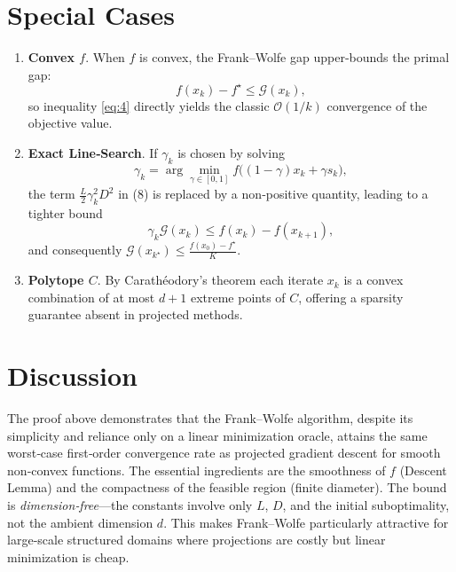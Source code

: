 \documentclass{article}
\newcommand{\gap}{\mathcal{G}}
\begin{document}
\section*{Special Cases}
\begin{enumerate}[leftmargin=*]
\item \textbf{Convex $f$}. When $f$ is convex, the Frank–Wolfe gap upper‑bounds the primal gap:
\[
f(x_k)-f^\star \le \gap(x_k),
\]
so inequality \eqref{eq:4} directly yields the classic $\mathcal O(1/k)$ convergence of the objective value.

\item \textbf{Exact Line‑Search}. If $\gamma_k$ is chosen by solving
\[
\gamma_k = \arg\min_{\gamma\in[0,1]} f\big((1-\gamma)x_k+\gamma s_k\big),
\]
the term $\frac{L}{2}\gamma_k^{2}D^{2}$ in (8) is replaced by a non‑positive quantity,
leading to a tighter bound
\[
\gamma_k\gap(x_k)\le f(x_k)-f(x_{k+1}),
\]
and consequently $\gap(x_{k^\star})\le \frac{f(x_0)-f^\star}{K}$.

\item \textbf{Polytope $C$}. By Carathéodory’s theorem each iterate $x_k$ is a convex combination of at most $d+1$ extreme points of $C$, offering a sparsity guarantee absent in projected methods.

\end{enumerate}

\section*{Discussion}
The proof above demonstrates that the Frank–Wolfe algorithm, despite its simplicity
and reliance only on a linear minimization oracle, attains the same worst‑case
first‑order convergence rate as projected gradient descent for smooth non‑convex
functions. The essential ingredients are the smoothness of $f$ (Descent Lemma) and
the compactness of the feasible region (finite diameter). The bound is
\emph{dimension‑free}—the constants involve only $L$, $D$, and the initial
suboptimality, not the ambient dimension $d$. This makes Frank–Wolfe particularly
attractive for large‑scale structured domains where projections are costly but
linear minimization is cheap.
\end{document}
